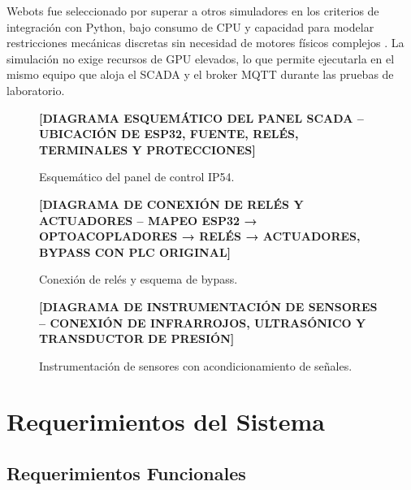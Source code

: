 Webots fue seleccionado por superar a otros simuladores en los criterios de integración con Python, bajo consumo de CPU y capacidad para modelar restricciones mecánicas discretas sin necesidad de motores físicos complejos \cite{michel2004webots}. La simulación no exige recursos de GPU elevados, lo que permite ejecutarla en el mismo equipo que aloja el SCADA y el broker MQTT durante las pruebas de laboratorio.

\begin{figure}[htbp]
\centering
\textbf{[DIAGRAMA ESQUEMÁTICO DEL PANEL SCADA – UBICACIÓN DE ESP32, FUENTE, RELÉS, TERMINALES Y PROTECCIONES]}
\caption{Esquemático del panel de control IP54.}
\label{fig:esq_panel}
\end{figure}

\begin{figure}[htbp]
\centering
\textbf{[DIAGRAMA DE CONEXIÓN DE RELÉS Y ACTUADORES – MAPEO ESP32 → OPTOACOPLADORES → RELÉS → ACTUADORES, BYPASS CON PLC ORIGINAL]}
\caption{Conexión de relés y esquema de bypass.}
\label{fig:conex_relays}
\end{figure}

\begin{figure}[htbp]
\centering
\textbf{[DIAGRAMA DE INSTRUMENTACIÓN DE SENSORES – CONEXIÓN DE INFRARROJOS, ULTRASÓNICO Y TRANSDUCTOR DE PRESIÓN]}
\caption{Instrumentación de sensores con acondicionamiento de señales.}
\label{fig:instr_sens}
\end{figure}

\section{Requerimientos del Sistema}

\subsection{Requerimientos Funcionales}

